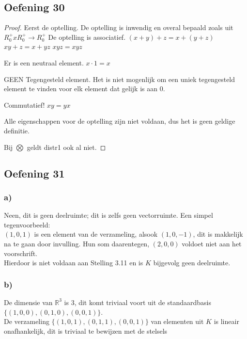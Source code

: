 \documentclass[lineaire_algebra_oplossingen.tex]{subfiles}
\begin{document}
\subsection{Oefening 30}
\begin{proof}
Eerst de optelling.
De optelling is inwendig en overal bepaald zoals uit $R_{0}^{+} x R_{0}^{+} \rightarrow R_{0}^{+} $ 
De optelling is associatief.
$ (x + y) + z = x + (y+z) $
$ xy + z = x + yz$
$ xyz = xyz $

Er is een neutraal element.
$x \cdot 1 = x $

GEEN Tegengesteld element.
Het is niet mogenlijk om een uniek tegengesteld element te vinden voor elk element dat gelijk is aan 0.

Commutatief!
$xy = yx$

Alle eigenschappen voor de optelling zijn niet voldaan, dus het is geen geldige definitie.

Bij $ \bigotimes $ geldt distr1 ook al niet.

\end{proof}

\subsection{Oefening 31}
\subsubsection*{a)}
Neen, dit is geen deelruimte; dit is zelfs geen vectorruimte. Een simpel tegenvoorbeeld:\\

$(1,0,1)$ is een element van de verzameling, alsook $(1,0,-1)$, dit is makkelijk na te gaan door invulling. Hun som daarentegen, $(2,0,0)$ voldoet niet aan het voorschrift.\\

Hierdoor is niet voldaan aan Stelling 3.11 en is $K$ bijgevolg geen deelruimte.

\subsubsection*{b)}

De dimensie van $\mathbb{R}^3$ is 3, dit komt triviaal voort uit de standaardbasis $\{(1,0,0),(0,1,0),(0,0,1)\}$.\\

De verzameling $\{(1,0,1),(0,1,1),(0,0,1)\}$ van elementen uit $K$ is lineair onafhankelijk, dit is triviaal te bewijzen met de stelsels
\end{document}
